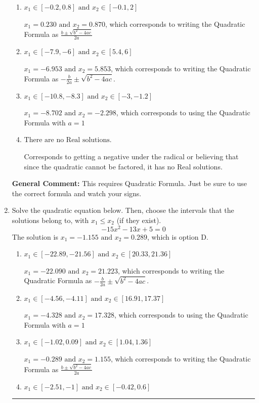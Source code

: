 \documentclass{extbook}[14pt]
\newcommand{\litem}[1]{\item #1

\rule{\textwidth}{0.4pt}}
\begin{document}
\begin{enumerate}
{\begin{enumerate}[label=\Alph*.]
* $x_1 = -0.870 \text{ and } x_2 = -0.230$, which is the correct option.
\item \( x_1 \in [-0.2, 0.8] \text{ and } x_2 \in [-0.1, 2] \)

 $x_1 = 0.230 \text{ and } x_2 = 0.870$, which corresponds to writing the Quadratic Formula as $\frac{b \pm \sqrt{b^2 - 4ac}}{2a}$
\item \( x_1 \in [-7.9, -6] \text{ and } x_2 \in [5.4, 6] \)

 $x_1 = -6.953 \text{ and } x_2 = 5.853$, which corresponds to writing the Quadratic Formula as $-\frac{b}{2a} \pm \sqrt{b^2 - 4ac}$.
\item \( x_1 \in [-10.8, -8.3] \text{ and } x_2 \in [-3, -1.2] \)

 $x_1 = -8.702 \text{ and } x_2 = -2.298$, which corresponds to using the Quadratic Formula with $a=1$
\item \( \text{There are no Real solutions.} \)

Corresponds to getting a negative under the radical or believing that since the quadratic cannot be factored, it has no Real solutions.
\end{enumerate}

\textbf{General Comment:} This requires Quadratic Formula. Just be sure to use the correct formula and watch your signs.
}
\litem{
Solve the quadratic equation below. Then, choose the intervals that the solutions belong to, with $x_1 \leq x_2$ (if they exist).
\[ -15x^{2} -13 x + 5 = 0 \]
The solution is \( x_1 = -1.155 \text{ and } x_2 = 0.289 \), which is option D.\begin{enumerate}[label=\Alph*.]
\item \( x_1 \in [-22.89, -21.56] \text{ and } x_2 \in [20.33, 21.36] \)

 $x_1 = -22.090 \text{ and } x_2 = 21.223$, which corresponds to writing the Quadratic Formula as $-\frac{b}{2a} \pm \sqrt{b^2 - 4ac}$.
\item \( x_1 \in [-4.56, -4.11] \text{ and } x_2 \in [16.91, 17.37] \)

 $x_1 = -4.328 \text{ and } x_2 = 17.328$, which corresponds to using the Quadratic Formula with $a=1$
\item \( x_1 \in [-1.02, 0.09] \text{ and } x_2 \in [1.04, 1.36] \)

 $x_1 = -0.289 \text{ and } x_2 = 1.155$, which corresponds to writing the Quadratic Formula as $\frac{b \pm \sqrt{b^2 - 4ac}}{2a}$
\item \( x_1 \in [-2.51, -1] \text{ and } x_2 \in [-0.42, 0.6] \)


\end{enumerate}}
\end{enumerate}
\end{document}
